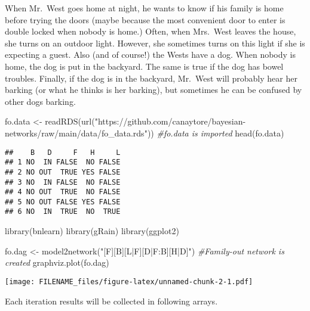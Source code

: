 \documentclass[
]{article}
\newenvironment{Shaded}{\begin{snugshade}}{\end{snugshade}}
\newcommand{\CommentTok}[1]{\textcolor[rgb]{0.56,0.35,0.01}{\textit{#1}}}
\newcommand{\FunctionTok}[1]{\textcolor[rgb]{0.00,0.00,0.00}{#1}}
\newcommand{\NormalTok}[1]{#1}
\newcommand{\OtherTok}[1]{\textcolor[rgb]{0.56,0.35,0.01}{#1}}
\newcommand{\StringTok}[1]{\textcolor[rgb]{0.31,0.60,0.02}{#1}}
\begin{document}
When Mr.~West goes home at night, he wants to know if his family is home before trying the doors (maybe because the most convenient door to enter is double locked when nobody is home.) Often, when Mrs.~West leaves the house, she turns on an outdoor light. However, she sometimes turns on this light if she is expecting a guest. Also (and of course!) the Wests have a dog. When nobody is home, the dog is put in the backyard. The same is true if the dog has bowel troubles. Finally, if the dog is in the backyard, Mr.~West will probably hear her barking (or what he thinks is her barking), but sometimes he can be confused by other dogs barking.

\begin{Shaded}
\begin{Highlighting}[]
\NormalTok{fo.data }\OtherTok{\textless{}{-}} \FunctionTok{readRDS}\NormalTok{(}\FunctionTok{url}\NormalTok{(}\StringTok{"https://github.com/canaytore/bayesian{-}networks/raw/main/data/fo\_data.rds"}\NormalTok{)) }\CommentTok{\#fo.data is imported}
\FunctionTok{head}\NormalTok{(fo.data)}
\end{Highlighting}
\end{Shaded}

\begin{verbatim}
##    B   D     F   H     L
## 1 NO  IN FALSE  NO FALSE
## 2 NO OUT  TRUE YES FALSE
## 3 NO  IN FALSE  NO FALSE
## 4 NO OUT  TRUE  NO FALSE
## 5 NO OUT FALSE YES FALSE
## 6 NO  IN  TRUE  NO  TRUE
\end{verbatim}

\begin{Shaded}
\begin{Highlighting}[]
\FunctionTok{library}\NormalTok{(bnlearn)}
\FunctionTok{library}\NormalTok{(gRain)}
\FunctionTok{library}\NormalTok{(ggplot2)}

\NormalTok{fo.dag }\OtherTok{\textless{}{-}} \FunctionTok{model2network}\NormalTok{(}\StringTok{"[F][B][L|F][D|F:B][H|D]"}\NormalTok{) }\CommentTok{\#Family{-}out network is created}
\FunctionTok{graphviz.plot}\NormalTok{(fo.dag)}
\end{Highlighting}
\end{Shaded}

\texttt{[image: FILENAME\_files/figure-latex/unnamed-chunk-2-1.pdf]}

Each iteration results will be collected in following arrays.
\end{document}
